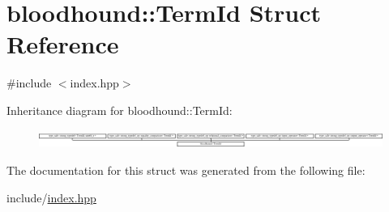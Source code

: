 \hypertarget{structbloodhound_1_1TermId}{}\section{bloodhound\+:\+:Term\+Id Struct Reference}
\label{structbloodhound_1_1TermId}


{\ttfamily \#include $<$index.\+hpp$>$}

Inheritance diagram for bloodhound\+:\+:Term\+Id\+:\begin{figure}[H]
\begin{center}
\leavevmode
\includegraphics[height=0.592593cm]{structbloodhound_1_1TermId}
\end{center}
\end{figure}


The documentation for this struct was generated from the following file\+:\begin{DoxyCompactItemize}
\item 
include/\hyperlink{index_8hpp}{index.\+hpp}\end{DoxyCompactItemize}
